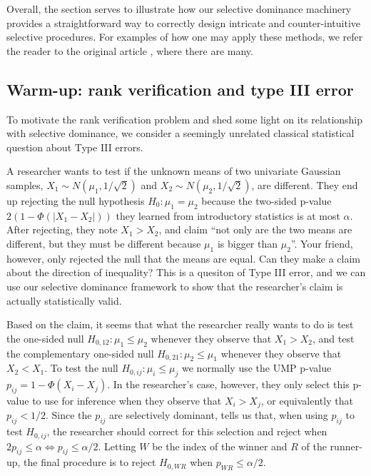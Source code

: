 \documentclass{article}
\begin{document}
Overall, the section serves to illustrate how our selective dominance machinery provides a straightforward way to correctly design intricate and counter-intuitive selective procedures. For examples of how one may apply these methods, we refer the reader to the original article \cite{Hung2019}, where there are many. 

\subsection{Warm-up: rank verification and type III error}

To motivate the rank verification problem and shed some light on its relationship with selective dominance, we consider a seemingly unrelated classical statistical question about Type III errors. 

A researcher wants to test if the unknown means of two univariate Gaussian samples, $X_1 \sim N(\mu_1, 1/\sqrt{2})$ and $X_2 \sim N(\mu_2, 1/\sqrt{2})$, are different. They end up rejecting the null hypothesis $H_0: \mu_1 = \mu_2$ because the two-sided p-value $2(1 - \Phi(|X_1 - X_2|))$ they learned from introductory statistics is at most $\alpha$. After rejecting, they note $X_1 > X_2$, and claim ``not only are the two means are different, but they must be different because $\mu_1$ is bigger than $\mu_2$''. Your friend, however, only rejected the null that the means are equal. Can they make a claim about the direction of inequality? This is a quesiton of Type III error, and we can use our selective dominance framework to show that the researcher's claim is actually statistically valid. 

Based on the claim, it seems that what the researcher really wants to do is test the one-sided null $H_{0, 12} : \mu_1 \leq \mu_2$ whenever they observe that $X_1 > X_2$, and test the complementary one-sided null $H_{0, 21} : \mu_2 \leq \mu_1$ whenever they observe that $X_2 < X_1$. To test the null $H_{0, ij} : \mu_i \leq \mu_j$ we normally use the UMP p-value $p_{ij} = 1 - \Phi(X_i - X_j)$. In the researcher's case, however, they only select this p-value to use for inference when they observe that $X_i > X_{j}$, or equivalently that $p_{ij} < 1/2$. Since the $p_{ij}$ are selectively dominant,  tells us that, when using $p_{ij}$ to test $H_{0, ij}$, the researcher should correct for this selection and reject when $2p_{ij} \leq \alpha \iff p_{ij} \leq \alpha/2$. Letting $W$ be the index of the winner and $R$ of the runner-up, the final procedure is to reject $H_{0, WR}$ when $p_{WR} \leq \alpha/2$. 
\end{document}
